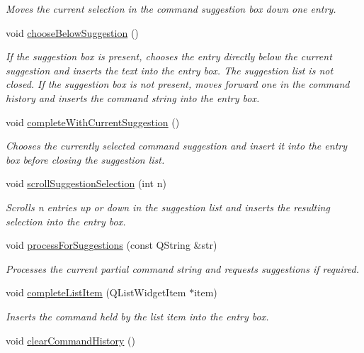 \begin{DoxyCompactItemize}
\begin{DoxyCompactList}\small\item\em Moves the current selection in the command suggestion box down one entry. \end{DoxyCompactList}\item 
\hypertarget{class_command_entry_box_a83b4d111d9b5d358752fd91876cd8b16}{void \hyperlink{class_command_entry_box_a83b4d111d9b5d358752fd91876cd8b16}{choose\-Below\-Suggestion} ()}\label{class_command_entry_box_a83b4d111d9b5d358752fd91876cd8b16}

\begin{DoxyCompactList}\small\item\em If the suggestion box is present, chooses the entry directly below the current suggestion and inserts the text into the entry box. The suggestion list is not closed. If the suggestion box is not present, moves forward one in the command history and inserts the command string into the entry box. \end{DoxyCompactList}\item 
\hypertarget{class_command_entry_box_af1af0e911dd16951a7c38c7cdbf18151}{void \hyperlink{class_command_entry_box_af1af0e911dd16951a7c38c7cdbf18151}{complete\-With\-Current\-Suggestion} ()}\label{class_command_entry_box_af1af0e911dd16951a7c38c7cdbf18151}

\begin{DoxyCompactList}\small\item\em Chooses the currently selected command suggestion and insert it into the entry box before closing the suggestion list. \end{DoxyCompactList}\item 
void \hyperlink{class_command_entry_box_a54b2fc4ebce5af818b61b3ade395fe3d}{scroll\-Suggestion\-Selection} (int n)
\begin{DoxyCompactList}\small\item\em Scrolls {\itshape n} entries up or down in the suggestion list and inserts the resulting selection into the entry box. \end{DoxyCompactList}\item 
void \hyperlink{class_command_entry_box_a7d011c6ec9253d4f4c994934d7275567}{process\-For\-Suggestions} (const Q\-String \&str)
\begin{DoxyCompactList}\small\item\em Processes the current partial command string and requests suggestions if required. \end{DoxyCompactList}\item 
void \hyperlink{class_command_entry_box_a922f73bd213ce52fb728f7459ac43a1c}{complete\-List\-Item} (Q\-List\-Widget\-Item $\ast$item)
\begin{DoxyCompactList}\small\item\em Inserts the command held by the list item into the entry box. \end{DoxyCompactList}\item 
\hypertarget{class_command_entry_box_a3d5fbb81f6400d1b827607feb1153606}{void \hyperlink{class_command_entry_box_a3d5fbb81f6400d1b827607feb1153606}{clear\-Command\-History} ()}\label{class_command_entry_box_a3d5fbb81f6400d1b827607feb1153606}


\end{DoxyCompactItemize}
